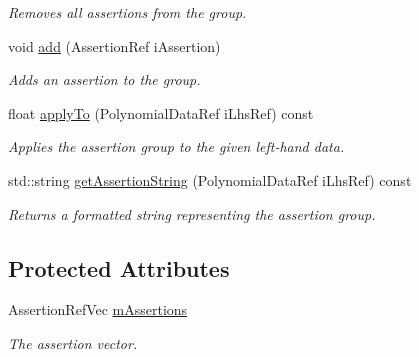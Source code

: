 \begin{DoxyCompactItemize}
\begin{DoxyCompactList}\small\item\em Removes all assertions from the group. \end{DoxyCompactList}\item 
\hypertarget{class_assertion_group_a63a3f6fdb949bb1890342e4ddc068c37}{void \hyperlink{class_assertion_group_a63a3f6fdb949bb1890342e4ddc068c37}{add} (Assertion\-Ref i\-Assertion)}\label{class_assertion_group_a63a3f6fdb949bb1890342e4ddc068c37}

\begin{DoxyCompactList}\small\item\em Adds an assertion to the group. \end{DoxyCompactList}\item 
\hypertarget{class_assertion_group_ae04b40c1699954e5687b99cb908f6247}{float \hyperlink{class_assertion_group_ae04b40c1699954e5687b99cb908f6247}{apply\-To} (Polynomial\-Data\-Ref i\-Lhs\-Ref) const }\label{class_assertion_group_ae04b40c1699954e5687b99cb908f6247}

\begin{DoxyCompactList}\small\item\em Applies the assertion group to the given left-\/hand data. \end{DoxyCompactList}\item 
\hypertarget{class_assertion_group_ace21115f1f3c8fb54330ed54bf888a40}{std\-::string \hyperlink{class_assertion_group_ace21115f1f3c8fb54330ed54bf888a40}{get\-Assertion\-String} (Polynomial\-Data\-Ref i\-Lhs\-Ref) const }\label{class_assertion_group_ace21115f1f3c8fb54330ed54bf888a40}

\begin{DoxyCompactList}\small\item\em Returns a formatted string representing the assertion group. \end{DoxyCompactList}\end{DoxyCompactItemize}
\subsection*{Protected Attributes}
\begin{DoxyCompactItemize}
\item 
\hypertarget{class_assertion_group_a577175165ea549a62e07764726264a8a}{Assertion\-Ref\-Vec \hyperlink{class_assertion_group_a577175165ea549a62e07764726264a8a}{m\-Assertions}}\label{class_assertion_group_a577175165ea549a62e07764726264a8a}

\begin{DoxyCompactList}\small\item\em The assertion vector. \end{DoxyCompactList}\end{DoxyCompactItemize}


